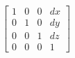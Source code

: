 $$
\begin{bmatrix}
  1 & 0 & 0 & dx \\
  0 & 1 & 0 & dy \\
  0 & 0 & 1 & dz \\
  0 & 0 & 0 & 1
\end{bmatrix}
$$
